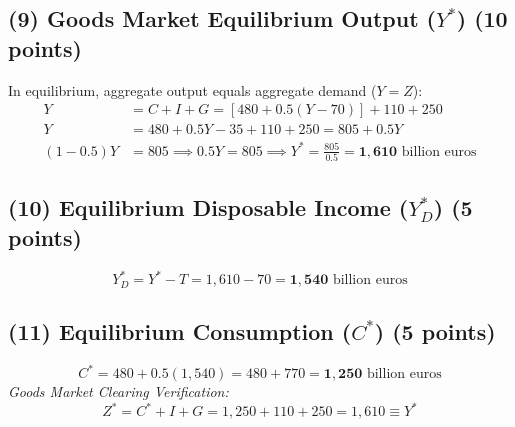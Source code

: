 \documentclass[11pt,a4paper]{article}
\begin{document}
\subsection*{(9) Goods Market Equilibrium Output ($Y^*$) (10 points)}
In equilibrium, aggregate output equals aggregate demand ($Y = Z$):
\begin{align}
    Y &= C + I + G = [480 + 0.5(Y - 70)] + 110 + 250 \\
    Y &= 480 + 0.5Y - 35 + 110 + 250 = 805 + 0.5Y \\
    (1 - 0.5) Y &= 805 \implies 0.5 Y = 805 \implies Y^* = \frac{805}{0.5} = \mathbf{1,610} \text{ billion euros}
\end{align}

\subsection*{(10) Equilibrium Disposable Income ($Y_D^*$) (5 points)}
\begin{equation}
    Y_D^* = Y^* - T = 1,610 - 70 = \mathbf{1,540} \text{ billion euros}
\end{equation}

\subsection*{(11) Equilibrium Consumption ($C^*$) (5 points)}
\begin{equation}
    C^* = 480 + 0.5(1,540) = 480 + 770 = \mathbf{1,250} \text{ billion euros}
\end{equation}
\textit{Goods Market Clearing Verification:}
\[Z^* = C^* + I + G = 1,250 + 110 + 250 = 1,610 \equiv Y^*\]
\end{document}
